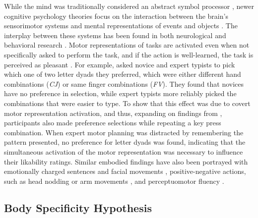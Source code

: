 \documentclass[english,man,man,mask]{apa6}
\theoremstyle{definition}
\theoremstyle{definition}
\theoremstyle{definition}
\theoremstyle{remark}
\begin{document}
While the mind was traditionally considered an abstract symbol processor
\autocite{Newell1976}, newer cognitive psychology theories focus on the
interaction between the brain's sensorimotor systems and mental
representations of events and objects
\autocites{Barsalou1999}{Zwaan1999}. The interplay between these systems
has been found in both neurological
\autocites{Hauk2004}{Lyons2010}{Tettamanti2005} and behavioral research
\autocites{Cartmill2012}{Holt2006}{Zwaan2006}. Motor representations of
tasks are activated even when not specifically asked to perform the
task, and if the action is well-learned, the task is perceived as
pleasant \autocites{Beilock2007}{Ping2009}{Yang2009}. For example,
\textcite{Beilock2007} asked novice and expert typists to pick which one
of two letter dyads they preferred, which were either different hand
combinations (\emph{CJ}) or same finger combinations (\emph{FV}). They
found that novices have no preference in selection, while expert typists
more reliably picked the combinations that were easier to type. To show
that this effect was due to covert motor representation activation, and
thus, expanding on findings from \textcite{VandenBergh1990},
participants also made preference selections while repeating a key press
combination. When expert motor planning was distracted by remembering
the pattern presented, no preference for letter dyads was found,
indicating that the simultaneous activation of the motor representation
was necessary to influence their likability ratings. Similar embodied
findings have also been portrayed with emotionally charged sentences and
facial movements \autocite{Havas2007}, positive-negative actions, such
as head nodding or arm movements \autocites{Glenberg2009}{Ping2009}, and
perceptuomotor fluency \autocites{Oppenheimer2008}{Yang2009}.

\subsection{Body Specificity
Hypothesis}\label{body-specificity-hypothesis}
\end{document}
